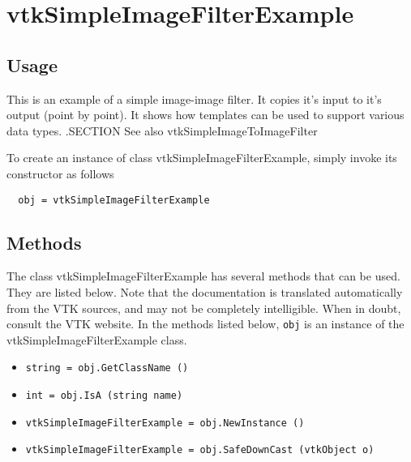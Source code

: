 \section{vtkSimpleImageFilterExample}

\subsection{Usage}

 This is an example of a simple image-image filter. It copies it's input
 to it's output (point by point). It shows how templates can be used
 to support various data types.
 .SECTION See also
 vtkSimpleImageToImageFilter

To create an instance of class vtkSimpleImageFilterExample, simply
invoke its constructor as follows
\begin{verbatim}
  obj = vtkSimpleImageFilterExample
\end{verbatim}
\subsection{Methods}

The class vtkSimpleImageFilterExample has several methods that can be used.
  They are listed below.
Note that the documentation is translated automatically from the VTK sources,
and may not be completely intelligible.  When in doubt, consult the VTK website.
In the methods listed below, \verb|obj| is an instance of the vtkSimpleImageFilterExample class.
\begin{itemize}
\item  \verb|string = obj.GetClassName ()|

\item  \verb|int = obj.IsA (string name)|

\item  \verb|vtkSimpleImageFilterExample = obj.NewInstance ()|

\item  \verb|vtkSimpleImageFilterExample = obj.SafeDownCast (vtkObject o)|

\end{itemize}
